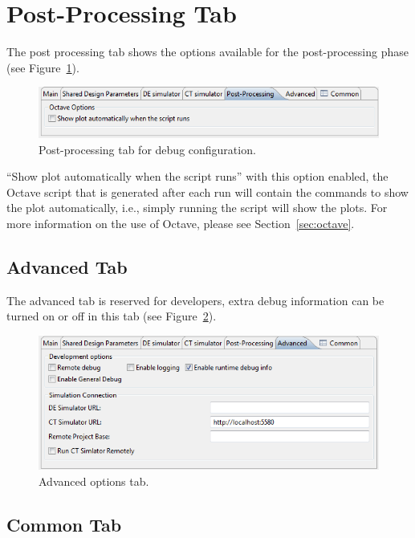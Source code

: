 \documentclass{crescendorepchap}
\begin{document}
\section{Post-Processing Tab}

The post processing tab shows the options available for the
post-processing phase (see Figure~\ref{fig:postproctab}).

\begin{figure}[htbp]
\centering
\includegraphics[width=.6\textwidth]{images/Postprocessingtab.png}
\caption{Post-processing tab for debug configuration.\label{fig:postproctab}}
\end{figure}

``Show plot automatically when the script runs'' with this option
enabled, the Octave script that is generated after each run will
contain the commands to show the plot automatically, i.e., simply
running the script will show the plots. For more information on the use of Octave, please see Section~\ref{sec:octave}.

\subsection{Advanced Tab}

The advanced tab is reserved for developers, extra debug information can
be turned on or off in this tab (see Figure~\ref{fig:advancedtab}). 

\begin{figure}[htbp]
\centering
\includegraphics[width=.6\textwidth]{images/Advancedoptionstab.png}
\caption{Advanced options tab.\label{fig:advancedtab}}
\end{figure}

\subsection{Common Tab}
\end{document}
